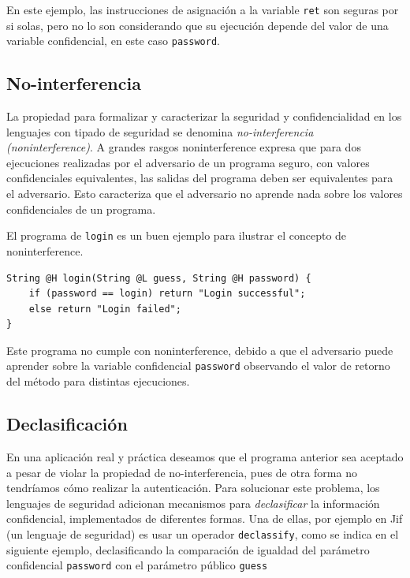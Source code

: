 	En este ejemplo, las instrucciones de asignación a la variable \texttt{ret} son seguras por si solas, pero no lo son considerando que su ejecución depende del valor de una variable confidencial, en este caso \texttt{password}.

	\subsection{No-interferencia}
	La propiedad para formalizar y caracterizar la seguridad y confidencialidad en los lenguajes con tipado de seguridad se denomina \textit{no-interferencia (noninterference)}. A grandes rasgos noninterference expresa que para dos ejecuciones realizadas por el adversario de un programa seguro, con valores confidenciales equivalentes, las salidas del programa deben ser equivalentes para el adversario. Esto caracteriza que el adversario no aprende nada sobre los valores confidenciales de un programa.

	El programa de \texttt{login} es un buen ejemplo para ilustrar el concepto de noninterference.

	\begin{lstlisting}
String @H login(String @L guess, String @H password) {
	if (password == login) return "Login successful";
	else return "Login failed";
}
	\end{lstlisting}

	Este programa no cumple con noninterference, debido a que el adversario puede aprender sobre la variable confidencial \texttt{password} observando el valor de retorno del método para distintas ejecuciones.

	\subsection{Declasificación}
	En una aplicación real y práctica deseamos que el programa anterior sea aceptado a pesar de violar la propiedad de no-interferencia, pues de otra forma no tendríamos cómo realizar la autenticación. Para solucionar este problema, los lenguajes de seguridad adicionan mecanismos para \textit{declasificar} la información confidencial, implementados de diferentes formas\cite{sabelfeldSands:JCS09}. Una de ellas, por ejemplo en Jif (un lenguaje de seguridad)\cite{jif} es usar un operador \texttt{declassify}, como se indica en el siguiente ejemplo, declasificando la comparación de igualdad del parámetro confidencial \texttt{password} con el parámetro público \texttt{guess} %

